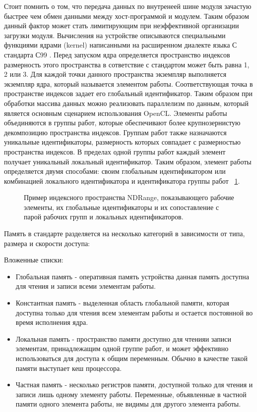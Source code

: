 Стоит помнить о том, что передача данных по внутренеей шине модуля зачастую быстрее чем обмен данными между хост-программой и модулем. Таким образом данный фактор может стать лимитирующим при неэффективной организации загрузки модуля. Вычисления на устройстве описываются специальными функциями ядрами (kernel) написанными на расширенном диалекте языка С стандарта С99 \cite{Kernighan1988, ISO:C99}. Перед запуском ядра определяется пространство индексов размерность этого пространства в сответствие с стандартом может быть равна 1, 2 или 3. Для каждой точки данного пространства экземпляр выполняется экземпляр ядра, который называется элементом работы. Соответствующая точка в пространстве индексов задает его глобальный идентификатор. Таким образом при обработки массива данных можно реализовать параллелизм по данным, который является основным сценарием использования OpenCL. Элементы работы объединяются в группы работ, которые обеспечивают более крупнозернистую  декомпозицию пространства индексов. Группам работ также назначаются уникальные идентификаторы, размерность которых совпадает с размерностью пространства индексов. В пределах  одной группы работ каждый элемент получает уникальный локальный идентификатор. Таким образом, элемент работы определяется двумя способами: своим глобальным идентификатором или комбинацией локального идентификатора и идентификатора группы работ ~\ref{fig:ndrange}.
\begin{figure}[ht]
  \caption{Пример индексного пространства NDRange, показывающего рабочие элементы, их глобальные идентификаторы и их сопоставление с парой рабочих групп и локальных идентификаторов.}\label{fig:ndrange}
\end{figure}


Память в стандарте разделяется на несколько категорий в зависимости от типа, размера и скорости доступа:

\noindent Вложенные списки:
\begin{itemize}
  \item Глобальная память - оперативная память устройства данная память доступна для чтения и записи всеми элементам работы.
  \item Константная память - выделенная область  глобальной  памяти, которая  доступна только для чтения всем элементам работы и остается постоянной во время исполнения ядра.
  \item Локальная память - пространство памяти доступно для чтенияи записи элементам, принадлежащим одной группе работ, и может эффективно использоваться для доступа к общим переменным. Обычно в качестве такой памяти выступает кеш процессора.
  \item Частная память - несколько регистров памяти, доступной только для чтения и записи лишь одному элементу работы. Переменные, объявленные в частной памяти одного элемента работы, не видимы для другого элемента работы.
\end{itemize}


